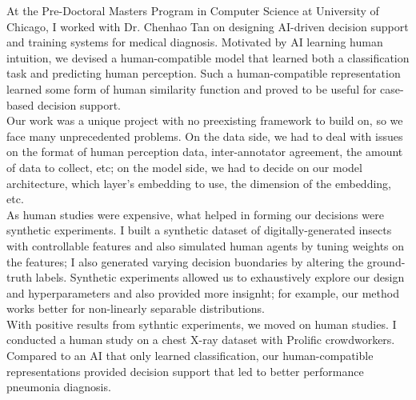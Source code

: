 


At the Pre-Doctoral Masters Program in Computer Science at University of Chicago, I worked with Dr. Chenhao Tan on designing AI-driven decision support and training systems for medical diagnosis.
Motivated by AI learning human intuition, we devised a human-compatible model that learned both a classification task and predicting human perception. Such a human-compatible representation learned some form of human similarity function and proved to be useful for case-based decision support.
\\

Our work was a unique project with no preexisting framework to build on, so we face many unprecedented problems.
On the data side, we had to deal with issues on the format of human perception data, inter-annotator agreement, the amount of data to collect, etc; on the model side, we had to decide on our model architecture, which layer's embedding to use, the dimension of the embedding, etc. 
\\
As human studies were expensive, what helped in forming our decisions were synthetic experiments. I built a synthetic dataset of digitally-generated insects with controllable features and also simulated human agents by tuning weights on the features; I also generated varying decision buondaries by altering the ground-truth labels. Synthetic experiments allowed us to exhaustively explore our design and hyperparameters and also provided more insignht; for example, our method works better for non-linearly separable distributions. 
\\
With positive results from sythntic experiments, we moved on human studies. I conducted a human study on a chest X-ray dataset with Prolific crowdworkers. Compared to an AI that only learned classification, our human-compatible representations provided decision support that led to better performance pneumonia diagnosis. 
\\

